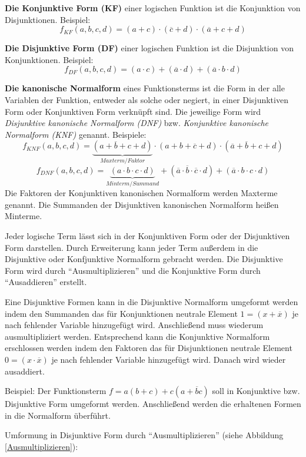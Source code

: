 \textbf{Die Konjunktive Form (KF)} einer logischen Funktion ist die Konjunktion von Disjunktionen. Beispiel:
$$ f_{\textit{KF}}(a,b,c,d) = (a + c) \cdot (\overline{c} + d)
	\cdot (\overline{a} + c + d) $$

\textbf{Die Disjunktive Form (DF)} einer logischen Funktion ist die Disjunktion von Konjunktionen. Beispiel:
$$ f_{\textit{DF}}(a,b,c,d) = (a \cdot c) + (\overline{a} \cdot d)
	+ (\overline{a} \cdot b \cdot d) $$

\textbf{Die kanonische Normalform} eines Funktionsterms ist die Form in der alle Variablen der Funktion, entweder als solche oder negiert, in einer Disjunktiven Form oder Konjunktiven Form verknüpft sind. Die jeweilige Form wird \textsl{Disjunktive kanonische Normalform (DNF)} bzw. \textsl{Konjunktive kanonische Normalform (KNF)} genannt. Beispiele:
$$ f_{\textit{KNF}}(a,b,c,d) = 
	\underbrace{(a + \overline{b} + c + d)}_{Maxterm / Faktor}
	\cdot (a + b +\overline{c} + d) 
	\cdot (\overline{a} + \overline{b} + c + d) $$
$$ f_{\textit{DNF}}(a,b,c,d) = 
	\underbrace{(a \cdot b \cdot c \cdot d)}_{Minterm / Summand}
	+ (\overline{a} \cdot \overline{b} \cdot \overline{c} \cdot d)
	+ (\overline{a} \cdot b \cdot c \cdot d) $$
Die Faktoren der Konjunktiven kanonischen Normalform werden Maxterme genannt. Die Summanden der Disjunktiven kanonischen Normalform heißen Minterme.

Jeder logische Term lässt sich in der Konjunktiven Form oder der Disjunktiven Form darstellen. Durch Erweiterung kann jeder Term außerdem in die Disjunktive oder Konfjunktive Normalform gebracht werden. Die Disjunktive Form wird durch "`Ausmultiplizieren"' und die Konjunktive Form durch "`Ausaddieren"' erstellt.

Eine Disjunktive Formen kann in die Disjunktive Normalform umgeformt werden indem den Summanden das für Konjunktionen neutrale Element $1 = (x + \overline{x})$ je nach fehlender Variable hinzugefügt wird. Anschließend muss wiederum ausmultipliziert werden. Entsprechend kann die Konjunktive Normalform erschlossen werden indem den Faktoren das für Disjunktionen neutrale Element $0 = (x \cdot \overline{x})$ je nach fehlender Variable hinzugefügt wird. Danach wird wieder ausaddiert.

Beispiel: Der Funktionsterm $f = a(b + c) + c(a + \overline{b}c)$ soll in Konjunktive bzw. Disjunktive Form umgeformt werden. Anschließend werden die erhaltenen Formen in die Normalform überführt.

Umformung in Disjunktive Form durch "`Ausmultiplizieren"' (siehe Abbildung \ref{Ausmultiplizieren}):

